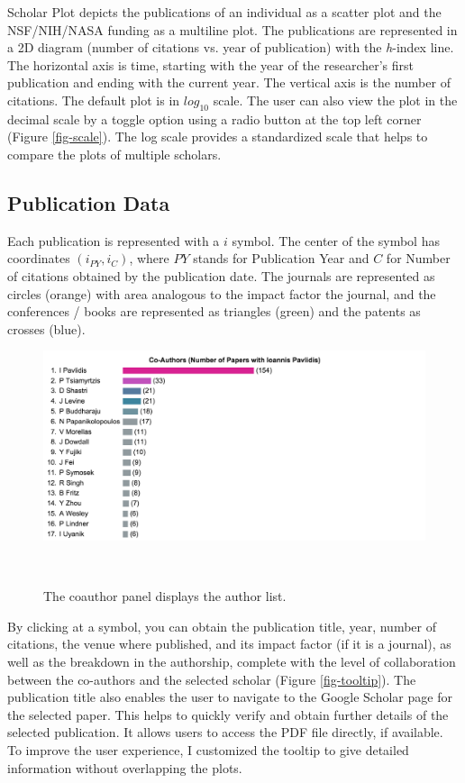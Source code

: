 Scholar Plot depicts the publications of an individual as a scatter plot and the NSF/NIH/NASA funding as a multiline plot. The publications are represented in a 2D diagram (number of citations vs. year of publication) with the {\it h}-index line. The horizontal axis is time, starting with the year of the researcher's first publication and ending with the current year. The vertical axis is the number of citations. The default plot is in $log_{10}$ scale. The user can also view the plot in the decimal scale by a toggle option using a radio button at the top left corner (Figure \ref{fig-scale}). The log scale provides a standardized scale that helps to compare the plots of multiple scholars.



\subsection{Publication Data}
Each publication is represented with a $i$ symbol. The center of the symbol has coordinates $(i_{PY}, i_{C})$, where $PY$ stands for Publication Year and $C$ for Number of citations obtained by the publication date. The journals are represented as circles (orange) with area analogous to the impact factor the journal, and the conferences / books are represented as triangles (green) and the patents as crosses (blue).

\begin{figure}
    \centering
    \includegraphics[width=1\textwidth]{figures/fig-panel-coauthros.png}
    \caption{The coauthor panel displays the author list.}~\label{fig-coauthors}
\end{figure}

By clicking at a symbol, you can obtain the publication title, year, number of citations, the venue where published, and its impact factor (if it is a journal), as well as the breakdown in the authorship, complete with the level of collaboration between the co-authors and the selected scholar (Figure \ref{fig-tooltip}). The publication title also enables the user to navigate to the Google Scholar page for the selected paper. This helps to quickly verify and obtain further details of the selected publication. It allows users to access the PDF file directly, if available. To improve the user experience, I customized the tooltip to give detailed information without overlapping the plots.


